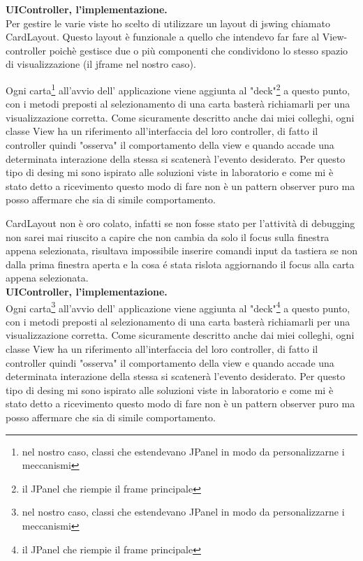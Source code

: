 \documentclass[a4paper,12pt]{report}
\begin{document}
\pagebreak
\textbf{UIController, l'implementazione.}\\
Per gestire le varie viste ho scelto di utilizzare un layout di jswing chiamato CardLayout.
Questo layout è funzionale a quello che intendevo far fare al View-controller poichè
gestisce due o più componenti che condividono lo stesso spazio di visualizzazione (il jframe nel nostro caso).

Ogni carta\footnote{nel nostro caso, classi che estendevano JPanel in modo da personalizzarne i meccanismi}
all'avvio dell' applicazione viene aggiunta al "deck"\footnote{il JPanel che riempie il frame principale}
a questo punto, con i metodi preposti al selezionamento di una carta basterà richiamarli per una visualizzazione
corretta.
Come sicuramente descritto anche dai miei colleghi, ogni classe View ha un riferimento all'interfaccia
del loro controller, di fatto il controller quindi "osserva" il comportamento della view e quando accade una
determinata interazione della stessa si scatenerà l'evento desiderato.
Per questo tipo di desing mi sono ispirato alle soluzioni viste in laboratorio e come mi è stato detto
a ricevimento questo modo di fare non è un pattern observer puro ma posso affermare che sia di simile
comportamento.

CardLayout non è oro colato, infatti se non fosse stato per l'attività di debugging non sarei mai riuscito
a capire che non cambia da solo il focus sulla finestra appena selezionata, risultava impossibile
inserire comandi input da tastiera se non dalla prima finestra aperta e la cosa é stata rislota
aggiornando il focus alla carta appena selezionata.
\\

\textbf{UIController, l'implementazione.}\\

Ogni carta\footnote{nel nostro caso, classi che estendevano JPanel in modo da personalizzarne i meccanismi}
all'avvio dell' applicazione viene aggiunta al "deck"\footnote{il JPanel che riempie il frame principale}
a questo punto, con i metodi preposti al selezionamento di una carta basterà richiamarli per una visualizzazione
corretta.
Come sicuramente descritto anche dai miei colleghi, ogni classe View ha un riferimento all'interfaccia
del loro controller, di fatto il controller quindi "osserva" il comportamento della view e quando accade una
determinata interazione della stessa si scatenerà l'evento desiderato.
Per questo tipo di desing mi sono ispirato alle soluzioni viste in laboratorio e come mi è stato detto
a ricevimento questo modo di fare non è un pattern observer puro ma posso affermare che sia di simile
comportamento.
\end{document}
